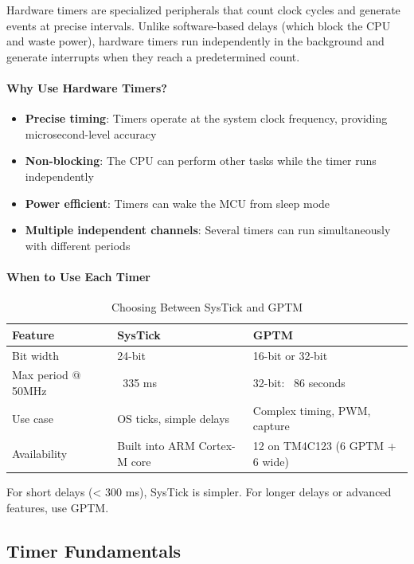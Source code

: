 Hardware timers are specialized peripherals that count clock cycles and generate events at precise intervals. Unlike software-based delays (which block the CPU and waste power), hardware timers run independently in the background and generate interrupts when they reach a predetermined count.

\paragraph*{Why Use Hardware Timers?}

\begin{itemize}[nosep]
  \item \textbf{Precise timing}: Timers operate at the system clock frequency, providing microsecond-level accuracy
  \item \textbf{Non-blocking}: The CPU can perform other tasks while the timer runs independently
  \item \textbf{Power efficient}: Timers can wake the MCU from sleep mode
  \item \textbf{Multiple independent channels}: Several timers can run simultaneously with different periods
\end{itemize}

\paragraph*{When to Use Each Timer}

\begin{table}[H]
  \centering
  \small
  \begin{tabular}{l l l}
    \toprule
    \textbf{Feature} & \textbf{SysTick} & \textbf{GPTM} \\
    \midrule
    Bit width & 24-bit & 16-bit or 32-bit \\
    Max period @ 50MHz & ~335 ms & 32-bit: ~86 seconds \\
    Use case & OS ticks, simple delays & Complex timing, PWM, capture \\
    Availability & Built into ARM Cortex-M core & 12 on TM4C123 (6 GPTM + 6 wide) \\
    \bottomrule
  \end{tabular}
  \caption{Choosing Between SysTick and GPTM}
\end{table}

\noindent
For short delays (< 300 ms), SysTick is simpler. For longer delays or advanced features, use GPTM.

\subsection{Timer Fundamentals}

